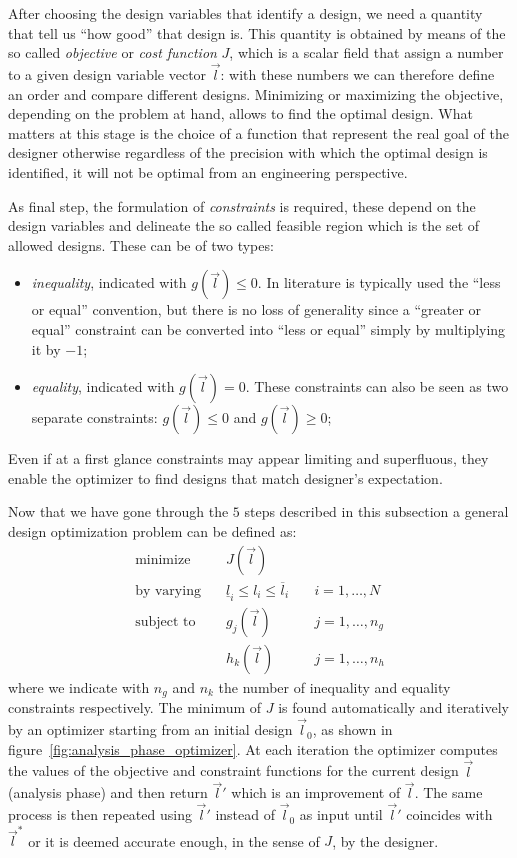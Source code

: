 \smallskip
After choosing the design variables that identify a design, we need a quantity that tell us ``how good'' that design is. This quantity is obtained by means of the so called \emph{objective} or \emph{cost function} $J$, which is a scalar field that assign a number to a given design variable vector $\vec{l}$: with these numbers we can therefore define an order and compare different designs. Minimizing or maximizing the objective, depending on the problem at hand, allows to find the optimal design. What matters at this stage is the choice of a function that represent the real goal of the designer otherwise regardless of the precision with which the optimal design is identified, it will not be optimal from an engineering perspective.

\smallskip
As final step, the formulation of \emph{constraints} is required, these depend on the design variables and delineate the so called feasible region which is the set of allowed designs. These can be of two types:
\begin{itemize}
	\item \emph{inequality}, indicated with $g(\vec{l}) \le 0$. In literature is typically used the ``less or equal'' convention, but there is no loss of generality since a ``greater or equal'' constraint can be converted into ``less or equal'' simply by multiplying it by $-1$;
	\item \emph{equality}, indicated with $g(\vec{l}) = 0$. These constraints can also be seen as two separate constraints: $g(\vec{l}) \le 0$ and $g(\vec{l}) \ge 0$;
\end{itemize}
Even if at a first glance constraints may appear limiting and superfluous, they enable the optimizer to find designs that match designer's expectation.

\medskip
Now that we have gone through the $5$ steps described in this subsection a general design optimization problem can be defined as:
\begin{equation}
\label{eqn:general_design_opt_problem_no_model}
\begin{aligned}
	\text{minimize}   & \quad J(\vec{l})														   \\
	\text{by varying} & \quad \underline{l}_i \le l_i \le \overline{l}_i  & \quad i=1, \dots, N    \\
	\text{subject to} & \quad g_j(\vec{l})								  & \quad j=1, \dots, n_g  \\
					  & \quad h_k(\vec{l})								  & \quad j=1, \dots, n_h
\end{aligned}
\end{equation}
where we indicate with $n_g$ and $n_k$ the number of inequality and equality constraints respectively.
The minimum of $J$ is found automatically and iteratively by an optimizer starting from an initial design $\vec{l}_0$, as shown in figure~\ref{fig:analysis_phase_optimizer}. At each iteration the optimizer computes the values of the objective and constraint functions for the current design $\vec{l}$ (analysis phase) and then return $\vec{l}'$ which is an improvement of $\vec{l}$. The same process is then repeated using $\vec{l}'$ instead of $\vec{l}_0$ as input until $\vec{l}'$ coincides with $\vec{l}^*$ or it is deemed accurate enough, in the sense of $J$, by the designer.

